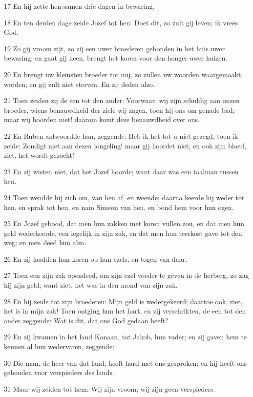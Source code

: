 \par 17 En hij zette hen samen drie dagen in bewaring.
\par 18 En ten derden dage zeide Jozef tot hen: Doet dit, zo zult gij leven; ik vrees God.
\par 19 Zo gij vroom zijt, zo zij een uwer broederen gebonden in het huis uwer bewaring; en gaat gij heen, brengt het koren voor den honger uwer huizen.
\par 20 En brengt uw kleinsten broeder tot mij, zo zullen uw woorden waargemaakt worden; en gij zult niet sterven. En zij deden alzo.
\par 21 Toen zeiden zij de een tot den ander: Voorwaar, wij zijn schuldig aan onzen broeder, wiens benauwdheid der ziele wij zagen, toen hij ons om genade bad; maar wij hoorden niet! daarom komt deze benauwdheid over ons.
\par 22 En Ruben antwoordde hun, zeggende: Heb ik het tot u niet gezegd, toen ik zeide: Zondigt niet aan dezen jongeling! maar gij hoordet niet; en ook zijn bloed, ziet, het wordt gezocht!
\par 23 En zij wisten niet, dat het Jozef hoorde; want daar was een taalman tussen hen.
\par 24 Toen wendde hij zich om, van hen af, en weende; daarna keerde hij weder tot hen, en sprak tot hen, en nam Simeon van hen, en bond hem voor hun ogen.
\par 25 En Jozef gebood, dat men hun zakken met koren vullen zou, en dat men hun geld wederkeerde, een iegelijk in zijn zak, en dat men hun teerkost gave tot den weg; en men deed hun alzo.
\par 26 En zij laadden hun koren op hun ezels, en togen van daar.
\par 27 Toen een zijn zak opendeed, om zijn ezel voeder te geven in de herberg, zo zag hij zijn geld; want ziet, het was in den mond van zijn zak.
\par 28 En hij zeide tot zijn broederen: Mijn geld is wedergekeerd; daartoe ook, ziet, het is in mijn zak! Toen ontging hun het hart, en zij verschrikten, de een tot den ander zeggende: Wat is dit, dat ons God gedaan heeft?
\par 29 En zij kwamen in het land Kanaan, tot Jakob, hun vader; en zij gaven hem te kennen al hun wedervaren, zeggende:
\par 30 Die man, de heer van dat land, heeft hard met ons gesproken; en hij heeft ons gehouden voor verspieders des lands.
\par 31 Maar wij zeiden tot hem: Wij zijn vroom; wij zijn geen verspieders.
